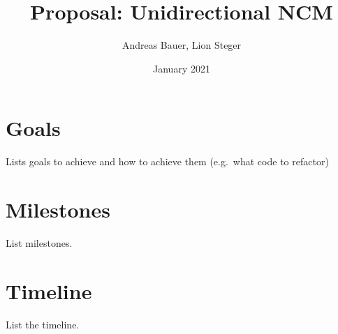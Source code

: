 \documentclass{proc}
\title{Proposal: Unidirectional NCM}
\author{Andreas Bauer, Lion Steger}
\date{January 2021}
\begin{document}
    \maketitle

    \section{Goals}\label{sec:goals}
    Lists goals to achieve and how to achieve them (e.g.\ what code to refactor)

    \section{Milestones}\label{sec:milestones}
    List milestones.

    \section{Timeline}\label{sec:timpelan}
    List the timeline.
\end{document}
